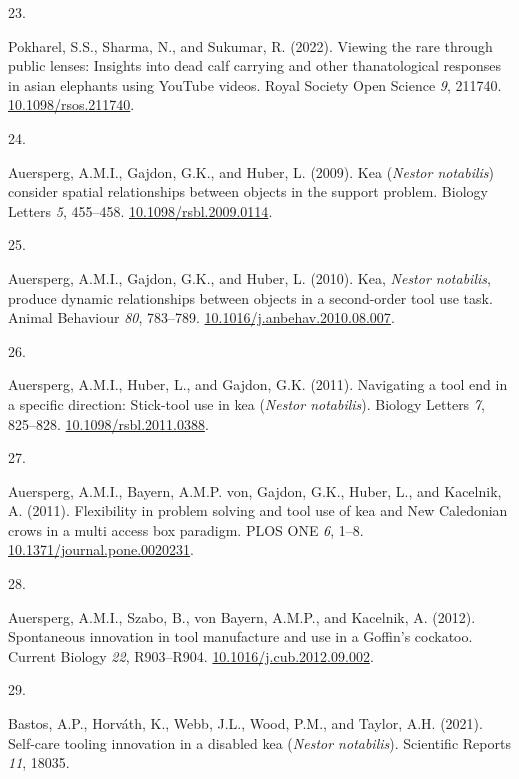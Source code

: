 \documentclass[
  man, donotrepeattitle,floatsintext]{apa6}
\newlength{\cslhangindent}
\newlength{\csllabelwidth}
\newlength{\cslentryspacingunit} %
\newenvironment{CSLReferences}[2] %
 {%
  \setlength{\parindent}{0pt}
  \ifodd #1
  \let\oldpar\par
  \def\par{\hangindent=\cslhangindent\oldpar}
  \fi
  \setlength{\parskip}{#2\cslentryspacingunit}
 }%
 {}
\newcommand{\CSLLeftMargin}[1]{\parbox[t]{\csllabelwidth}{#1}}
\newcommand{\CSLRightInline}[1]{\parbox[t]{\linewidth - \csllabelwidth}{#1}\break}
\begin{document}
\begin{CSLReferences}{0}{0}
\leavevmode{}%
\CSLLeftMargin{23. }%
\CSLRightInline{Pokharel, S.S., Sharma, N., and Sukumar, R. (2022). Viewing the rare through public lenses: Insights into dead calf carrying and other thanatological responses in asian elephants using YouTube videos. Royal Society Open Science \emph{9}, 211740. \href{https://doi.org/10.1098/rsos.211740}{10.1098/rsos.211740}.}

\leavevmode{}%
\CSLLeftMargin{24. }%
\CSLRightInline{Auersperg, A.M.I., Gajdon, G.K., and Huber, L. (2009). Kea (\emph{{N}estor notabilis}) consider spatial relationships between objects in the support problem. Biology Letters \emph{5}, 455--458. \href{https://doi.org/10.1098/rsbl.2009.0114}{10.1098/rsbl.2009.0114}.}

\leavevmode{}%
\CSLLeftMargin{25. }%
\CSLRightInline{Auersperg, A.M.I., Gajdon, G.K., and Huber, L. (2010). Kea, \emph{{N}estor notabilis}, produce dynamic relationships between objects in a second-order tool use task. Animal Behaviour \emph{80}, 783--789. \href{https://doi.org/10.1016/j.anbehav.2010.08.007}{10.1016/j.anbehav.2010.08.007}.}

\leavevmode{}%
\CSLLeftMargin{26. }%
\CSLRightInline{Auersperg, A.M.I., Huber, L., and Gajdon, G.K. (2011). Navigating a tool end in a specific direction: Stick-tool use in kea (\emph{{N}estor notabilis}). Biology Letters \emph{7}, 825--828. \href{https://doi.org/10.1098/rsbl.2011.0388}{10.1098/rsbl.2011.0388}.}

\leavevmode{}%
\CSLLeftMargin{27. }%
\CSLRightInline{Auersperg, A.M.I., Bayern, A.M.P. von, Gajdon, G.K., Huber, L., and Kacelnik, A. (2011). Flexibility in problem solving and tool use of kea and {N}ew {C}aledonian crows in a multi access box paradigm. PLOS ONE \emph{6}, 1--8. \href{https://doi.org/10.1371/journal.pone.0020231}{10.1371/journal.pone.0020231}.}

\leavevmode{}%
\CSLLeftMargin{28. }%
\CSLRightInline{Auersperg, A.M.I., Szabo, B., von Bayern, A.M.P., and Kacelnik, A. (2012). Spontaneous innovation in tool manufacture and use in a {G}offin's cockatoo. Current Biology \emph{22}, R903--R904. \href{https://doi.org/10.1016/j.cub.2012.09.002}{10.1016/j.cub.2012.09.002}.}

\leavevmode{}%
\CSLLeftMargin{29. }%
\CSLRightInline{Bastos, A.P., Horváth, K., Webb, J.L., Wood, P.M., and Taylor, A.H. (2021). Self-care tooling innovation in a disabled kea (\emph{{N}estor notabilis}). Scientific Reports \emph{11}, 18035.}


\end{CSLReferences}
\end{document}
